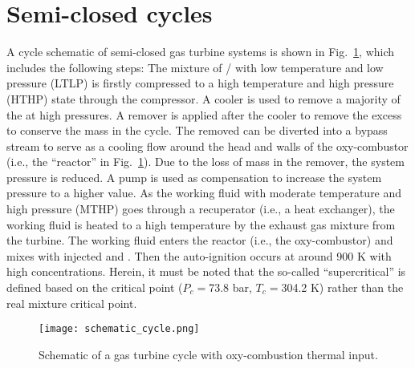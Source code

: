     \section{Semi-closed  cycles} \label{app:sCO2cycle}
    A cycle schematic of semi-closed  gas turbine systems is shown in Fig.~\ref{fig1}, which includes the following steps: The mixture of / with low temperature and low pressure (LTLP) is firstly compressed to a high temperature and high pressure (HTHP) state through the compressor. A cooler is used to remove a majority of the  at high pressures. %
    A remover is applied after the cooler to remove the excess  to conserve the mass in the cycle. The removed  can be diverted into a bypass stream to serve as a cooling flow around the head and walls of the oxy-combustor (i.e., the ``reactor'' in Fig.~\ref{fig1}). Due to the loss of mass in the remover, the system pressure is reduced. A pump is used as compensation to increase the system pressure to a higher value. As the working fluid with moderate temperature and high pressure (MTHP) goes through a recuperator (i.e., a heat exchanger), the working fluid is heated to a high temperature by the exhaust gas mixture from the turbine. The working fluid enters the reactor (i.e., the oxy-combustor) and mixes with injected  and . Then the auto-ignition occurs at around 900 K with high  concentrations. Herein, it must be noted that the so-called ``supercritical'' is defined based on the  critical point ($P_c=$73.8 bar, $T_c=$304.2 K) rather than the real mixture critical point.
    \begin{figure}[htbp]
        \begin{center}
            \texttt{[image: schematic\_cycle.png]}
        \end{center}
        \caption{Schematic of a  gas turbine cycle with oxy-combustion thermal input.}
        \label{fig1}
    \end{figure}


